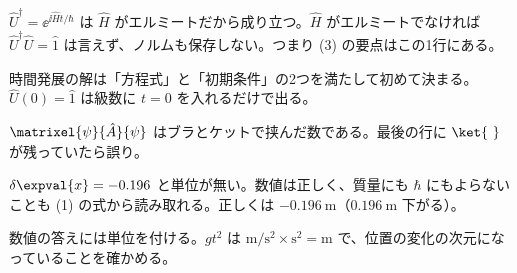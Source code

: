 \begin{rikai}
  \item $\hat{U}^{\dagger}=\ee^{\ii\hat{H}t/\hbar}$ は $\hat{H}$ がエルミートだから成り立つ。$\hat{H}$ がエルミートでなければ $\hat{U}^{\dagger}\hat{U}=\hat{1}$ は言えず、ノルムも保存しない。つまり (3) の要点はこの1行にある。
  \item 時間発展の解は「方程式」と「初期条件」の2つを満たして初めて決まる。$\hat{U}(0)=\hat{1}$ は級数に $t=0$ を入れるだけで出る。
  \item $\matrixel{\psi}{\hat{A}}{\psi}$ はブラとケットで挟んだ数である。最後の行に $\ket{\ }$ が残っていたら誤り。
\end{rikai}
\begin{kotaeran}
   $\delta\expval{x}=-0.196$ と単位が無い。数値は正しく、質量にも $\hbar$ にもよらないことも (1) の式から読み取れる。正しくは $\qty{-0.196}{\metre}$（$\qty{0.196}{\metre}$ 下がる）。
\end{kotaeran}
\begin{rikai}
  \item 数値の答えには単位を付ける。$gt^{2}$ は $\unit{\metre\per\second\squared}\times\unit{\second\squared}=\unit{\metre}$ で、位置の変化の次元になっていることを確かめる。
\end{rikai}

